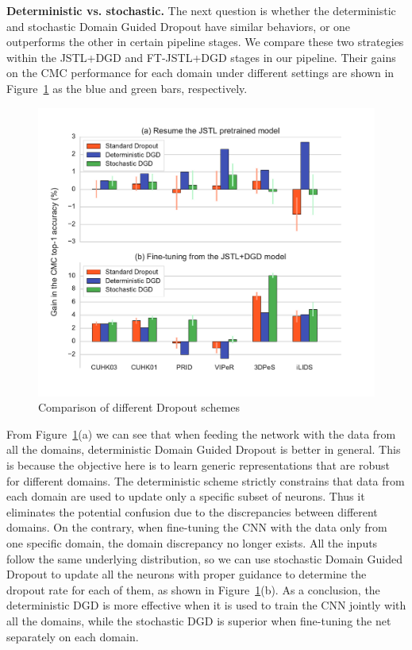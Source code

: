 \textbf{Deterministic vs. stochastic.} The next question is whether the deterministic and stochastic Domain Guided Dropout have similar behaviors, or one outperforms the other in certain pipeline stages. We compare these two strategies within the JSTL+DGD and FT-JSTL+DGD stages in our pipeline. Their gains on the CMC performance for each domain under different settings are shown in Figure~\ref{fig:comparison_with_dropout} as the blue and green bars, respectively.

\begin{figure}[t]
\begin{center}
\includegraphics[width=1.0\linewidth]{figures/multi_domain/standard_vs_deterministic_vs_stochastic.pdf}
\end{center}
\caption{Comparison of different Dropout schemes}
\label{fig:comparison_with_dropout}
\end{figure}

From Figure~\ref{fig:comparison_with_dropout}(a) we can see that when feeding the network with the data from all the domains, deterministic Domain Guided Dropout is better in general. This is because the objective here is to learn generic representations that are robust for different domains. The deterministic scheme strictly constrains that data from each domain are used to update only a specific subset of neurons. Thus it eliminates the potential confusion due to the discrepancies between different domains. On the contrary, when fine-tuning the CNN with the data only from one specific domain, the domain discrepancy no longer exists. All the inputs follow the same underlying distribution, so we can use stochastic Domain Guided Dropout to update all the neurons with proper guidance to determine the dropout rate for each of them, as shown in Figure~\ref{fig:comparison_with_dropout}(b). As a conclusion, the deterministic DGD is more effective when it is used to train the CNN jointly with all the domains, while the stochastic DGD is superior when fine-tuning the net separately on each domain.

